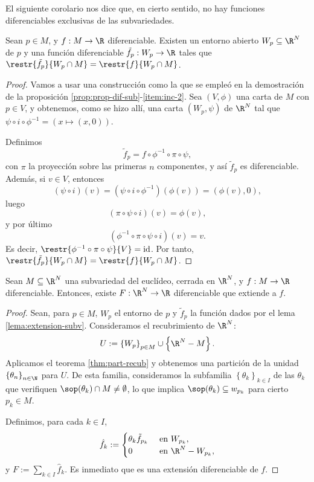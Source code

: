 El siguiente corolario nos dice que, en cierto sentido, no hay funciones
diferenciables exclusivas de las subvariedades.
\begin{lema} \label{lema:extension-subv}
  Sean $p\in M$, y $f:M\to \R$ diferenciable. Existen un entorno abierto $W_{p}\subseteq \R^{N}$ de $p$ y una
  función diferenciable $\tilde{f}_{p}: W_{p}\to \R$ tales que
  $\restr{\tilde{f_{p}}}{W_{p}\cap M} = \restr{f}{W_{p}\cap M}$.
\end{lema}
\begin{proof}
  Vamos a usar una construcción como la que se empleó en la demostración de la
  proposición \ref{prop:prop-dif-sub}-\ref{item:inc-2}. Sea $(V,\phi)$ una carta
  de $M$ con $p\in V$, y obtenemos, como se hizo allí, una carta $(W_{p},\psi)$ de $\R^{N}$ tal
  que $\psi\circ i\circ\phi^{-1} = (x\mapsto (x,0))$.

  Definimos
  \[
    \tilde{f}_{p} = f\circ \phi^{-1} \circ\pi\circ\psi
    ,\]
  con $\pi$ la proyección sobre las primeras $n$ componentes, y así
  $\tilde{f}_{p}$ es diferenciable. Además, si $v\in V$, entonces
  \[
    (\psi\circ i)(v) = (\psi\circ i \circ\phi^{-1})(\phi(v)) = (\phi(v), 0)
    ,\]
  luego
  \[
    (\pi\circ\psi\circ i)(v) = \phi(v)
    ,\]
  y por último
  \[
    (\phi^{-1}\circ\pi\circ\psi\circ i)(v) = v
    .\]
  Es decir, $\restr{\phi^{-1}\circ\pi\circ\psi}{V} = \mathrm{id}$. Por tanto,
  $\restr{\tilde{f}_{p}}{W_{p}\cap M} = \restr{f}{W_{p}\cap M}$.
\end{proof}
\begin{ncor} \label{cor:ext-fun-subv}
  Sean $M\subseteq \R^{N}$ una subvariedad del euclídeo, cerrada en $\R^{N}$, y
  $f:M\to\R$ diferenciable. Entonces, existe $F:\R^{N}\to\R$ diferenciable que
  extiende a $f$.
\end{ncor}
\begin{proof}
  Sean, para $p\in M$, $W_{p}$ el entorno de $p$ y $\tilde{f}_{p}$ la función
  dados por el lema \ref{lema:extension-subv}. Consideramos el recubrimiento de
  $\R^{N}$:
  \[
    U := \left\{ W_{p} \right\}_{p\in M} \cup \left\{ \R^{N}-M \right\}
    .\]
  Aplicamos el teorema \ref{thm:part-recub} y obtenemos una partición de la
  unidad $\left\{ \theta_{n} \right\}_{n\in\N}$ para $U$. De esta familia,
  consideramos la subfamilia $\left\{ \theta_{k} \right\}_{k\in I}$ de las
  $\theta_{k}$ que verifiquen $\sop(\theta_{k})\cap M \ne \emptyset$, lo que
  implica $\sop(\theta_{k}) \subseteq w_{p_{k}}$ para cierto $p_{k}\in M$.

  Definimos, para cada $k\in I$,
  \[
    \hat{f}_{k} :=
    \begin{cases}
      \theta_{k}\tilde{f}_{p_{k}} & \text{ en $W_{p_{k}}$}, \\
      0 & \text{ en $\R^{N}-W_{p_{k}}$},
    \end{cases}
  \]
  y $F := \sum_{k\in I} \hat{f}_{k}$. Es inmediato que es una extensión
  diferenciable de $f$.
\end{proof}